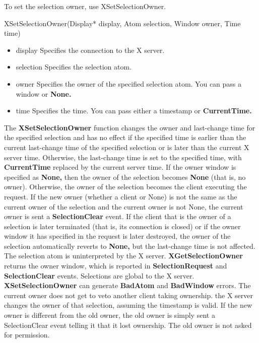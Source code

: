 \documentclass{report}
\begin{document}
\begin{itemize}
        \bigbreak \noindent 
        To set the selection owner, use XSetSelectionOwner.
        \bigbreak \noindent 
        \begin{cppcode}
            XSetSelectionOwner(Display* display, Atom selection, Window owner, Time time)
        \end{cppcode}
        \begin{itemize}
            \item display Specifies the connection to the X server.
            \item selection Specifies the selection atom.
            \item owner Specifies the owner of the specified selection atom. You can pass a window or \textbf{None.}
            \item time Specifies the time. You can pass either a timestamp or \textbf{CurrentTime.}
        \end{itemize}
        The \textbf{XSetSelectionOwner} function changes the owner and last-change time for the specified selection and has no effect if the specified time is earlier than the current last-change time of the specified selection or is later than the current X server time. Otherwise, the last-change time is set to the specified time, with \textbf{CurrentTime} replaced by the current server time. If the owner window is specified as \textbf{None,} then the owner of the selection becomes \textbf{None} (that is, no owner). Otherwise, the owner of the selection becomes the client executing the request.
        \bigbreak \noindent 
        If the new owner (whether a client or None) is not the same as the current owner of the selection and the current owner is not None, the current owner is sent a \textbf{SelectionClear} event. If the client that is the owner of a selection is later terminated (that is, its connection is closed) or if the owner window it has specified in the request is later destroyed, the owner of the selection automatically reverts to \textbf{None,} but the last-change time is not affected. The selection atom is uninterpreted by the X server. \textbf{XGetSelectionOwner} returns the owner window, which is reported in \textbf{SelectionRequest} and \textbf{SelectionClear} events. Selections are global to the X server.
        \bigbreak \noindent 
        \textbf{XSetSelectionOwner} can generate \textbf{BadAtom} and \textbf{BadWindow} errors.
        \bigbreak \noindent 
        The current owner does not get to veto another client taking ownership. the X server changes the owner of that selection, assuming the timestamp is valid. If the new owner is different from the old owner, the old owner is simply sent a SelectionClear event telling it that it lost ownership. The old owner is not asked for permission.

\end{itemize}
\end{document}
